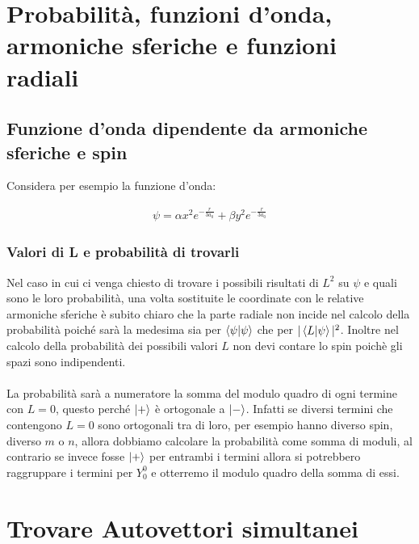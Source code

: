 	

\section{Probabilità, funzioni d'onda, armoniche sferiche e funzioni radiali}


\subsection{Funzione d'onda dipendente da armoniche sferiche e spin}

	Considera per esempio la funzione d'onda:
	
\begin{align*}	
	\psi = \alpha x^2 e^{- \frac{r}{3 a_0}} + \beta y^2 e^{- \frac{r}{3 a_0}}
\end{align*}

\subsubsection{Valori di L e probabilità di trovarli}

	Nel caso in cui ci venga chiesto di trovare i possibili risultati di $L^2$ su $\psi$ e quali sono le loro probabilità, una volta sostituite le coordinate con le relative armoniche sferiche è subito chiaro che la parte radiale non incide nel calcolo della probabilità poiché sarà la medesima sia per $\braket{\psi}{\psi}$ che per $|\braket{L}{\psi}|^2$. Inoltre nel calcolo della probabilità dei possibili valori $L$ non devi contare lo spin poichè gli spazi sono indipendenti.
	\\
	\\
	La probabilità sarà a numeratore la somma del modulo quadro di ogni termine con $L = 0$, questo perché $\ket{+}$ è ortogonale a $\ket{-}$. Infatti se diversi termini che contengono $L = 0$ sono ortogonali tra di loro, per esempio hanno diverso spin, diverso $m$ o $n$, allora dobbiamo calcolare la probabilità come somma di moduli, al contrario se invece fosse $\ket{+}$ per entrambi i termini allora si potrebbero raggruppare i termini per $Y_0^0$ e otterremo il modulo quadro della somma di essi.



\section{Trovare Autovettori simultanei}
	
